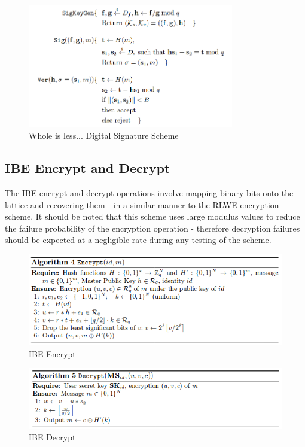 \begin{figure}[H]
\centering
\includegraphics[width=9cm]{ake_hash_and_sign.png}
\caption{Whole is less... Digital Signature Scheme}
\label{fig:ake_digital_signature}
\end{figure}

\subsection{IBE Encrypt and Decrypt}

The IBE encrypt and decrypt operations involve mapping binary bits onto the lattice and recovering them - in a similar manner to the RLWE encryption scheme. It should be noted that this scheme uses large modulus values to reduce the failure probability of the encryption operation - therefore decryption failures should be expected at a negligible rate during any testing of the scheme.

\begin{figure}[H]
\centering
\includegraphics[width=14cm]{ibe_encrypt.png}
\caption{IBE Encrypt}
\label{fig:ibe_encrypt}
\end{figure}

\begin{figure}[H]
\centering
\includegraphics[width=14cm]{ibe_decrypt.png}
\caption{IBE Decrypt}
\label{fig:ibe_decrypt}
\end{figure}

